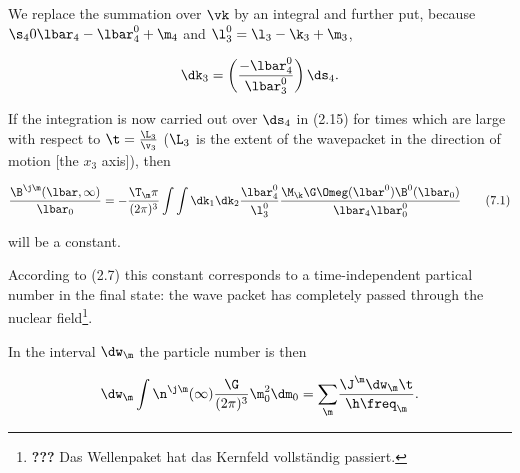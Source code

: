 \documentclass{article}
\newcommand{\WTF}[1]{\footnote{\textbf{???} #1}}
\newcommand{\nequ}[2]{
\begin{align*}
#1
\tag{#2}
\end{align*}
}
\newcommand{\uequ}[1]{
\begin{align*}
#1
\end{align*}
}
\newcommand{\sumX}[1]{\underset{#1}{\sum}}
\begin{document}
We replace the summation over $\vk$ by an integral and further put, because $\s_40\lbar_4-\lbar^0_4+\m_4$ and $\l^0_3 = \l_3 - \k_3 + \m_3$,
\uequ{
\dk_3 = \left(\frac{-\lbar^0_4}{\lbar^0_3}\right)\ds_4.
}

If the integration is now carried out over $\ds_4$ in (2.15) for times which are large with respect to $\t=\frac{\L_3}{\v_3}$ ($\L_3$ is the extent of the wavepacket in the direction of motion [the $x_3$ axis]), then
\nequ{
\frac{\B^{\j\m}(\lbar,\infty)}{\lbar_0} =
 -\frac{\T_\m\pi}{(2\pi)^3}\int\int\dk_1\dk_2\frac{\lbar^0_4}{\l^0_3}
  \frac{\M_\k\G\Omeg(\lbar^0)\B^0(\lbar_0)}{\lbar_4\lbar^0_0}
}{7.1}
will be a constant.

According to (2.7) this constant corresponds to a time-independent partical number in the final state: the wave packet has completely passed through the nuclear field\WTF{Das Wellenpaket hat das Kernfeld vollständig passiert.}.

In the interval $\dw_\m$ the particle number is then
\uequ{
\dw_\m\int\n^{\j\m}(\infty)\frac{\G}{(2\pi)^3}\m_0^2\dm_0 =
 \sumX{\m}\frac{\J^\m\dw_\m\t}{\h\freq_\m}.
}
\end{document}
